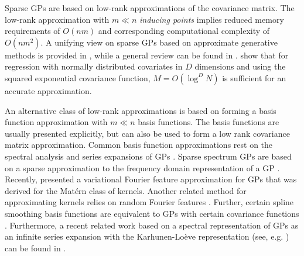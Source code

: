 \documentclass[onecolumn,a4paper,11pt]{article}
\begin{document}
Sparse GPs are based on low-rank approximations of the covariance matrix. The low-rank approximation with $m \ll n$ {\it inducing points} implies reduced memory requirements of $O(nm)$ and corresponding computational complexity of $O(nm^2)$.
A unifying view on sparse GPs based on approximate generative methods
is provided in \cite{quinonero2005unifying}, while a general review
can be found in \cite{rasmussen2006gaussian}. \citet{Burt+Rasmussen+vanderWilk:2019} show that for regression with normally distributed covariates in $D$ dimensions and using the squared exponential covariance function, $M=O(\log^DN)$ is sufficient for an accurate approximation.

An alternative class of low-rank approximations is based on forming a basis function approximation with $m \ll n$ basis functions. The basis functions are usually presented explicitly, but can also be used to form a low rank covariance matrix approximation. Common basis function approximations rest on the spectral analysis and series expansions of GPs \citep{loeve1977probability,trees1968detection,adler1981geometry,cramer2013stationary}.
Sparse spectrum GPs are based on a sparse approximation to the frequency domain representation of a GP \citep{lazaro2010sparse,quia2010sparse,gal2015improving}. Recently, \cite{hensman2017variational} presented a variational Fourier feature approximation for GPs that was derived for the Mat{\'e}rn class of kernels. Another related method for approximating kernels relies on random Fourier features \citep{rahimi2008random,rahimi2009weighted}.
Further, certain spline smoothing basis functions are equivalent to GPs with certain covariance functions \citep{wahba1990spline,Furrer+Nychka:2007}.
Furthermore, a recent related work based on a spectral representation of GPs as an infinite series expansion with the Karhunen-Loève representation (see, e.g. \cite{grenander1981abstract}) can be found in \cite{JSSv090i10}.

\end{document}

